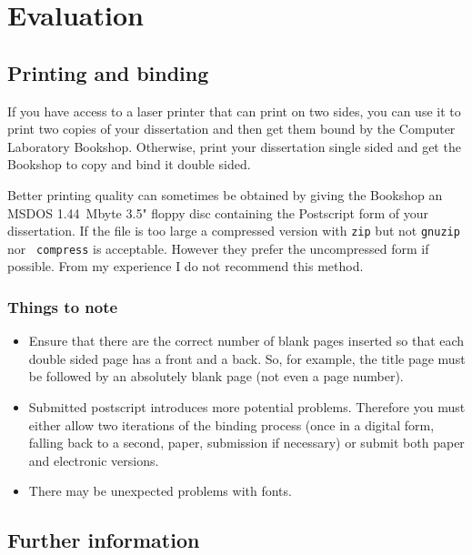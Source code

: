 \documentclass[12pt,twoside,notitlepage]{report}
\begin{document}
\chapter{Evaluation}

\section{Printing and binding}

If you have access to a laser printer that can print on two sides, you
can use it to print two copies of your dissertation and then get them
bound by the Computer Laboratory Bookshop. Otherwise, print your
dissertation single sided and get the Bookshop to copy and bind it double
sided.


Better printing quality can sometimes be obtained by giving the
Bookshop an MSDOS 1.44~Mbyte 3.5" floppy disc containing the
Postscript form of your dissertation. If the file is too large a
compressed version with {\tt zip} but not {\tt gnuzip} nor {\tt
compress} is acceptable. However they prefer the uncompressed form if
possible. From my experience I do not recommend this method.

\subsection{Things to note}

\begin{itemize}
\item Ensure that there are the correct number of blank pages inserted
so that each double sided page has a front and a back.  So, for
example, the title page must be followed by an absolutely blank page
(not even a page number).

\item Submitted postscript introduces more potential problems.
Therefore you must either allow two iterations of the binding process
(once in a digital form, falling back to a second, paper, submission if
necessary) or submit both paper and electronic versions.

\item There may be unexpected problems with fonts.

\end{itemize}

\section{Further information}
\end{document}
